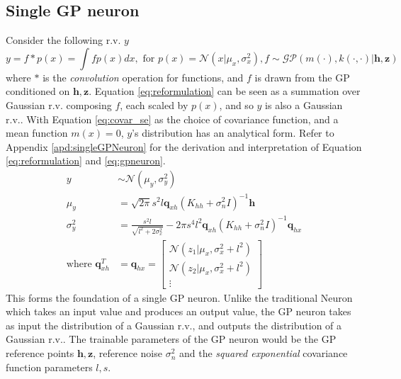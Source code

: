 \documentclass{article}
\begin{document}
\subsection{Single GP neuron}
Consider the following r.v. $y$
\begin{equation}
	y=f\ast p(x)=\int f p(x)dx,\text{ for }p(x)=\mathcal{N}(x|\mu_x,\sigma_x^2), f\sim\mathcal{GP}(m(\cdot),k(\cdot,\cdot)|\boldsymbol{h},\boldsymbol{z})
    \label{eq:reformulation}
\end{equation}
where $\ast$ is the \textit{convolution} operation for functions, and $f$ is drawn from the GP conditioned on $\boldsymbol{h},\boldsymbol{z}$. Equation \ref{eq:reformulation} can be seen as a summation over Gaussian r.v. composing $f$, each scaled by $p(x)$, and so $y$ is also a Gaussian r.v.. With Equation \ref{eq:covar_se} as the choice of covariance function, and a mean function $m(x)=0$, $y$'s distribution has an analytical form. Refer to Appendix \ref{apd:singleGPNeuron} for the derivation and interpretation of Equation \ref{eq:reformulation} and \ref{eq:gpneuron}.
\begin{equation}
    \begin{aligned}
        y&\sim\mathcal{N}(\mu_y, \sigma_y^2) \\
        \mu_y&=\sqrt{2\pi}s^2l\boldsymbol{q}_{xh}(K_{hh}+\sigma_n^2 I)^{-1}\boldsymbol{h} \\
        \sigma_y^2&=\frac{s^2l}{\sqrt{l^2+2\sigma_x^2}} - 2\pi s^4 l^2 \boldsymbol{q}_{xh}(K_{hh}+\sigma_n^2 I)^{-1}\boldsymbol{q}_{hx} \\
        \text{where }\boldsymbol{q}_{xh}^T&=\boldsymbol{q}_{hx}=\begin{bmatrix}
            \mathcal{N}(z_1|\mu_x,\sigma_x^2+l^2) \\
            \mathcal{N}(z_2|\mu_x,\sigma_x^2+l^2) \\
            \vdots
        \end{bmatrix}
        \label{eq:gpneuron}
    \end{aligned}
\end{equation}
This forms the foundation of a single GP neuron. Unlike the traditional Neuron \cite{ANN} which takes an input value and produces an output value, the GP neuron takes as input the distribution of a Gaussian r.v., and outputs the distribution of a Gaussian r.v.. The trainable parameters of the GP neuron would be the GP reference points $\boldsymbol{h}, \boldsymbol{z}$, reference noise $\sigma_n^2$ and the \textit{squared exponential} covariance function parameters $l, s$.
\end{document}
